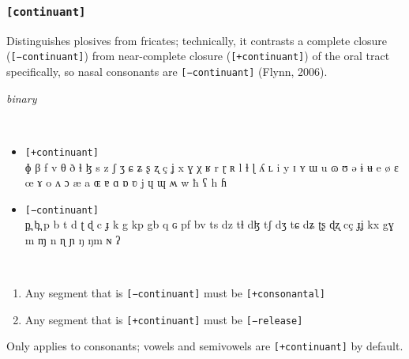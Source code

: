 \documentclass[10pt,letterpaper]{article}
\begin{document}
\subsubsection{\texttt{[continuant]}}
\label{ssub:feature_continuant}
\begin{samepage}
\begin{description}
\itemsep1pt \parskip0pt  
\item[Descritpion] Distinguishes plosives from fricates; technically, it contrasts a complete closure (\texttt{[−continuant]}) from near-complete closure (\texttt{[+continuant]}) of the oral tract specifically, so nasal consonants are \texttt{[−continuant]} (Flynn, 2006).
\item[Type] \emph{binary}
\item[Examples]\
  \begin{itemize}
    \item \texttt{[+continuant]}\\
    ɸ β f v θ ð ɬ ɮ s z ʃ ʒ ɕ ʑ ʂ ʐ ç ʝ x ɣ χ ʁ r ɽ ʀ l ɫ ɭ ʎ ʟ i y ɪ ʏ ɯ u ɷ ʊ ə ɨ ʉ e ø ɛ œ ɤ o ʌ ɔ æ a ɶ ɐ ɑ ɒ ʋ j ɥ ɰ ʍ w ħ ʕ h ɦ 
    \item \texttt{[−continuant]}\\
     p̪ b̪ p b t d ʈ ɖ c ɟ k g kp gb q ɢ pf bv ts dz tɬ dɮ tʃ dʒ tɕ dʑ ʈʂ ɖʐ cç ɟʝ kx gɣ m ɱ n ɳ ɲ ŋ ŋm ɴ ʔ 
  \end{itemize}
\item[Constraints]\
  \begin{enumerate}
  \itemsep1pt \parskip0pt  
    \item Any segment that is \texttt{[−continuant]} must be \texttt{[+consonantal]}
    \item Any segment that is \texttt{[+continuant]} must be \texttt{[−release]}
  \end{enumerate}
\item[Resctrictions] Only applies to consonants; vowels and semivowels are \texttt{[+continuant]} by default.
\end{description}
\end{samepage}
\end{document}
